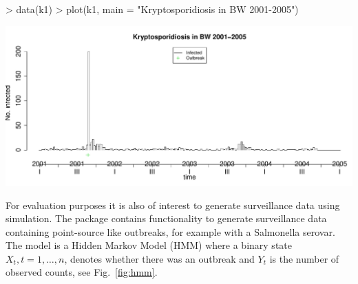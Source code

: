 \documentclass[a4paper,11pt]{article}
\begin{document}
\begin{Schunk}
\begin{Sinput}
> data(k1)
> plot(k1, main = "Kryptosporidiosis in BW 2001-2005")
\end{Sinput}
\end{Schunk}
\includegraphics{figs/vignette-002}

For evaluation purposes it is also of interest to generate
surveillance data using simulation. The package contains functionality
to generate surveillance data containing point-source like outbreaks,
for example with a Salmonella serovar. The model is a Hidden Markov
Model (HMM) where a binary state $X_t, t=1,\ldots,n$, denotes whether
there was an outbreak and $Y_t$ is the number of observed
counts, see Fig.~\ref{fig:hmm}.
\end{document}
